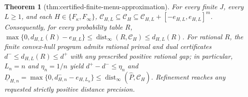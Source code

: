 \documentclass{article}
\newtheorem{theorem}{Theorem}
\begin{document}
\begin{theorem}[thm:certified-finite-menu-approximation]\label{thm:certified-finite-menu-approximation}
For every finite \(J\), every \(L\ge1\), and each \(H\in\{F_\kappa,F_\infty\}\), \(\mathcal C_{H,L}\subseteq\mathcal C_H\subseteq\mathcal C_{H,L}+[-e_{H,L},e_{H,L}]^m\). Consequently, for every probability table \(R\), \(\max\{0,d_{H,L}(R)-e_{H,L}\}\le\operatorname{dist}_\infty(R,\mathcal C_H)\le d_{H,L}(R)\). For rational \(R\), the finite convex-hull program admits rational primal and dual certificates \(d^-\le d_{H,L}(R)\le d^+\) with any prescribed positive rational gap; in particular, \(L_n=n\) and \(\eta_n=1/n\) yield \(d^+-d^-\le\eta_n\) and \(\underline D_{H,n}=\max\{0,d^-_{H,n}-e_{H,L_n}\}\le\operatorname{dist}_\infty(\widehat P,\mathcal C_H)\). Refinement reaches any requested strictly positive distance precision.
\end{theorem}
\end{document}
